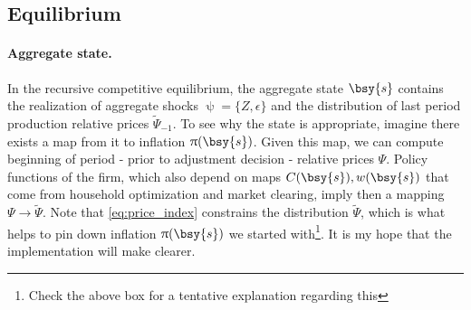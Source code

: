 \documentclass[a4paper,10pt]{article}  %
\begin{document}
\subsection{Equilibrium} %
\label{sub:equilibrium}

\paragraph{\normalfont\bf Aggregate state.} 
In the recursive competitive equilibrium, the aggregate state $ \bsy{s} $ contains the realization of aggregate shocks $ \uppsi =
\big\{ Z, \epsilon \big\} $ and the distribution of last period production relative prices $ \widetilde{\Psi}_{-1} $. To see why the
state is appropriate, imagine there exists a map from it to inflation $ \uppi(\bsy{s} ) $. Given this map, we can compute beginning of
period - prior to adjustment decision - relative prices $\Psi$. Policy functions of the firm, which also depend on maps $ C(\bsy{s} ),
w(\bsy{s} )$ that come from household optimization and market clearing, imply then a mapping $ \Psi \rightarrow \widetilde{\Psi} $.
Note that \eqref{eq:price_index} constrains the distribution $ \widetilde{\Psi} $, which is what helps to pin down inflation $\uppi(
\bsy{s})$ we started with\footnote{Check the above box for a tentative explanation regarding this}. It is my hope that the
implementation will make clearer.
\end{document}
